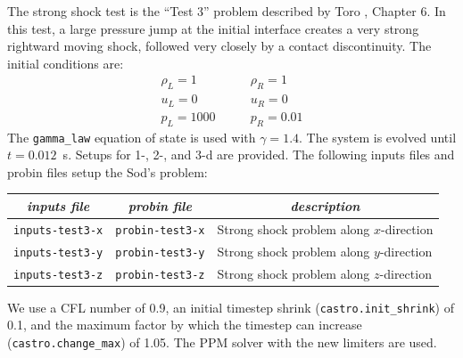 The strong shock test is the ``Test 3'' problem described by Toro
\cite{toro:1997}, Chapter 6.  In this test, a large pressure jump
at the initial interface creates a very strong rightward moving
shock, followed very closely by a contact discontinuity.
The initial conditions are:
\begin{equation}
\begin{array}{l}
\rho_L = 1 \\
u_L = 0 \\
p_L = 1000
\end{array}
\qquad
\begin{array}{l}
\rho_R = 1 \\
u_R = 0 \\
p_R = 0.01
\end{array}
\end{equation}
The {\tt gamma\_law} equation of state is used with $\gamma = 1.4$.
The system is evolved until $t = 0.012$~s.  Setups for 1-, 2-, and 3-d
are provided.  The following inputs files and probin files setup the
Sod's problem:
\begin{table}[h]
\centering
\begin{tabular}{|l|l|l|} \hline
\multicolumn{1}{|c}{\em inputs file} &  \multicolumn{1}{|c}{\em probin file} & \multicolumn{1}{|c|}{\em description} \\
\hline
{\tt inputs-test3-x} & {\tt probin-test3-x} & Strong shock problem along $x$-direction \\
{\tt inputs-test3-y} & {\tt probin-test3-y} & Strong shock problem along $y$-direction \\
{\tt inputs-test3-z} & {\tt probin-test3-z} & Strong shock problem along $z$-direction \\
\hline
\end{tabular}
\label{Table:Sod}
\end{table}

We use a CFL number of 0.9, an initial
timestep shrink ({\tt castro.init\_shrink}) of 0.1, and the maximum factor by which
the timestep can increase ({\tt castro.change\_max}) of 1.05.  The PPM
solver with the new limiters are used.

